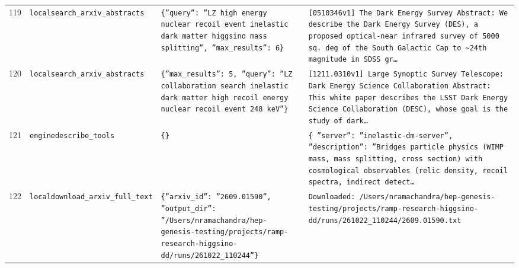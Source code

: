 \documentclass[11pt,a4paper]{article}
\begin{document}
\begin{longtable}{@{}p{}p{}p{}p{}@{}}
119 & \texttt{local}\newline\texttt{search\_\allowbreak{}arxiv\_\allowbreak{}abstracts} & \texttt{\{''query'':\allowbreak{} ''LZ high energy nuclear recoil event inelastic dark matter higgsino mass splitting'',\allowbreak{} ''max\_\allowbreak{}results'':\allowbreak{} 6\}\allowbreak{}} & \texttt{[0510346v1]\allowbreak{} The Dark Energy Survey Abstract:\allowbreak{}   We describe the Dark Energy Survey (DES)\allowbreak{},\allowbreak{} a proposed optical-near infrared survey of 5000 sq. deg of the South Galactic Cap to \textasciitilde{}\allowbreak{}24th magnitude in SDSS gr\ldots{}\allowbreak{}} \\
120 & \texttt{local}\newline\texttt{search\_\allowbreak{}arxiv\_\allowbreak{}abstracts} & \texttt{\{''max\_\allowbreak{}results'':\allowbreak{} 5,\allowbreak{} ''query'':\allowbreak{} ''LZ collaboration search inelastic dark matter high recoil energy nuclear recoil event 248 keV''\}\allowbreak{}} & \texttt{[1211.0310v1]\allowbreak{} Large Synoptic Survey Telescope:\allowbreak{} Dark Energy Science Collaboration Abstract:\allowbreak{} This white paper describes the LSST Dark Energy Science Collaboration (DESC)\allowbreak{},\allowbreak{} whose goal is the study of dark\ldots{}\allowbreak{}} \\
121 & \texttt{engine}\newline\texttt{describe\_\allowbreak{}tools} & \texttt{\{\}\allowbreak{}} & \texttt{\{   ''server'':\allowbreak{} ''inelastic-dm-server'',\allowbreak{}   ''description'':\allowbreak{} ''Bridges particle physics (WIMP mass,\allowbreak{} mass splitting,\allowbreak{} cross section)\allowbreak{} with cosmological observables (relic density,\allowbreak{} recoil spectra,\allowbreak{} indirect detect\ldots{}\allowbreak{}} \\
122 & \texttt{local}\newline\texttt{download\_\allowbreak{}arxiv\_\allowbreak{}full\_\allowbreak{}text} & \texttt{\{''arxiv\_\allowbreak{}id'':\allowbreak{} ''2609.01590'',\allowbreak{} ''output\_\allowbreak{}dir'':\allowbreak{} ''/\allowbreak{}Users/\allowbreak{}nramachandra/\allowbreak{}hep-genesis-testing/\allowbreak{}projects/\allowbreak{}ramp-research-higgsino-dd/\allowbreak{}runs/\allowbreak{}261022\_\allowbreak{}110244''\}\allowbreak{}} & \texttt{Downloaded:\allowbreak{} /\allowbreak{}Users/\allowbreak{}nramachandra/\allowbreak{}hep-genesis-testing/\allowbreak{}projects/\allowbreak{}ramp-research-higgsino-dd/\allowbreak{}runs/\allowbreak{}261022\_\allowbreak{}110244/\allowbreak{}2609.01590.txt} \\

\end{longtable}
\end{document}
